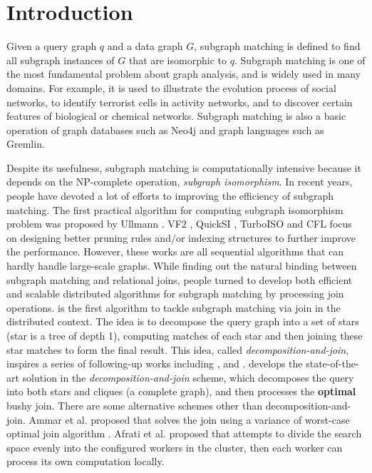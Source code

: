 \section{Introduction}
\label{sec:intro}
Given a query graph $q$ and a data graph $G$, subgraph matching is defined to find all subgraph instances of $G$ that are isomorphic to $q$. Subgraph matching is one of the most fundamental problem about graph analysis, and is widely used in many domains. For example, it is used to illustrate the evolution process of social networks\cite{kairam2012life}, to identify terrorist cells in activity networks\cite{cook2006mining}, and to discover certain features of biological or chemical networks\cite{Cannataro2010}. Subgraph matching is also a basic operation of graph databases such as Neo4j\cite{neo4j} and graph languages such as Gremlin\cite{gremlin}.

 Despite its usefulness, subgraph matching is computationally intensive because it depends on the NP-complete operation, \textit{subgraph isomorphism}\cite{Shamir97}. In recent years, people have devoted a lot of efforts to improving the efficiency of subgraph matching. The first practical algorithm for computing subgraph isomorphism problem was proposed by Ullmann \cite{Ullmann1976}. VF2 \cite{cordella2004sub}, QuickSI \cite{Shang2008}, TurboISO \cite{turbo-iso} and CFL \cite{bi-fei} focus on designing better pruning rules and/or indexing structures to further improve the performance. However, these works are all sequential algorithms that can hardly handle large-scale graphs. While finding out the natural binding between subgraph matching and relational joins, people turned to develop both efficient and scalable distributed algorithms for subgraph matching by processing join operations. \starjoin \cite{star-join} is the first algorithm to tackle subgraph matching via join in the distributed context. The idea is to decompose the query graph into a set of stars (star is a tree of depth 1), computing matches of each star and then joining these star matches to form the final result. This idea, called \textit{decomposition-and-join}, inspires a series of following-up works including \psgl \cite{Shao2014}, \ttjoin \cite{Lai2015} and \cliquejoin \cite{Lai2016}. \cliquejoin develops the state-of-the-art solution in the \textit{decomposition-and-join} scheme, which decomposes the query into both stars and cliques (a complete graph), and then processes the \textbf{optimal} bushy join. There are some alternative schemes other than decomposition-and-join. Ammar et al. proposed \bigjoin that solves the join using a variance of worst-case optimal join algorithm \cite{generic-join}. Afrati et al. proposed \multiwayjoin \cite{AfratiFU13}  that attempts to divide the search space evenly into the configured workers in the cluster, then each worker can process its own computation locally. 

